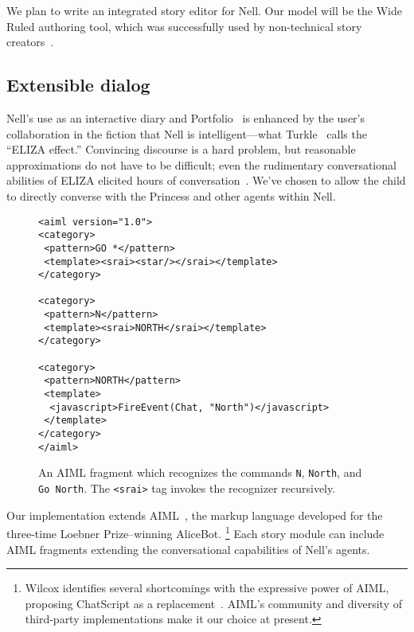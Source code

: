 \documentclass[preprint]{sig-alternate}
\begin{document}
We plan to write an integrated story editor for Nell.  Our model will
be the Wide Ruled authoring tool, which was successfully used by
non-technical story creators~\cite{skorupski:2009}.


\subsection{Extensible dialog}
Nell's use as an interactive diary and
Portfolio~\cite{stefanakis:portfolios} is enhanced by the user's
collaboration in the fiction that Nell is intelligent---what
Turkle~\cite{turkle:alone} calls the ``ELIZA effect.''
Convincing discourse is a hard problem, but
reasonable approximations do not have to be difficult; even
the rudimentary conversational abilities of ELIZA elicited hours of
conversation~\cite{weizenbaum:power}.
We've chosen to allow the child to directly converse with the
Princess and other agents within Nell.

\begin{figure}\small
\begin{verbatim}
<aiml version="1.0">
<category>
 <pattern>GO *</pattern>
 <template><srai><star/></srai></template>
</category>

<category>
 <pattern>N</pattern>
 <template><srai>NORTH</srai></template>
</category>

<category>
 <pattern>NORTH</pattern>
 <template>
  <javascript>FireEvent(Chat, "North")</javascript>
 </template>
</category>
</aiml>
\end{verbatim}
\caption{An AIML fragment which recognizes the commands \texttt{N},
  \texttt{North}, and \texttt{Go North}. The \texttt{<srai>} tag invokes the
  recognizer recursively.}\label{fig:aiml}
\end{figure}

Our implementation extends AIML~\cite{aiml:2005},
the markup language developed for the three-time Loebner Prize--winning
AliceBot.%
\footnote{Wilcox identifies several shortcomings with the expressive
  power of AIML, proposing ChatScript as a
  replacement~\cite{wilcox:2010}.  AIML's community and
  diversity of third-party implementations make it our choice at present.}
Each story module can include AIML fragments extending the
conversational capabilities of Nell's agents.
\end{document}
